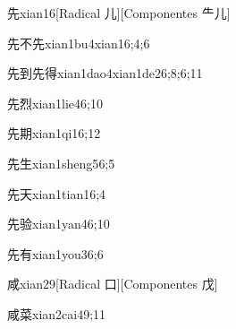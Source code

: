 \begin{verbete}{先}{xian1}{6}[Radical 儿][Componentes ⺧儿]
\end{verbete}

\begin{verbete}{先不先}{xian1bu4xian1}{6;4;6}
\end{verbete}

\begin{verbete}{先到先得}{xian1dao4xian1de2}{6;8;6;11}
\end{verbete}

\begin{verbete}{先烈}{xian1lie4}{6;10}
\end{verbete}

\begin{verbete}{先期}{xian1qi1}{6;12}
\end{verbete}

\begin{verbete}{先生}{xian1sheng5}{6;5}
\end{verbete}

\begin{verbete}{先天}{xian1tian1}{6;4}
\end{verbete}

\begin{verbete}{先验}{xian1yan4}{6;10}
\end{verbete}

\begin{verbete}{先有}{xian1you3}{6;6}
\end{verbete}

\begin{verbete}{咸}{xian2}{9}[Radical 口][Componentes 戊]
\end{verbete}

\begin{verbete}{咸菜}{xian2cai4}{9;11}
\end{verbete}

